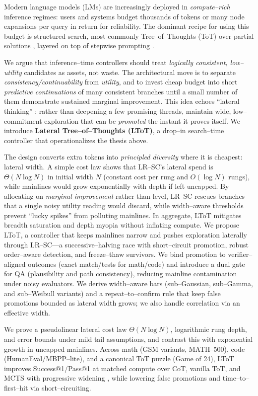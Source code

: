 \documentclass{article}
\begin{document}
Modern language models (LMs) are increasingly deployed in \emph{compute--rich} inference regimes: users and systems budget thousands of tokens or many node expansions per query in return for reliability.
The dominant recipe for using this budget is structured search, most commonly Tree--of--Thoughts (ToT) over partial solutions \citep{yao2023tot}, layered on top of stepwise prompting \citep{wei2022cot,wang2022selfconsistency,kojima2022zeroshotcot}.

We argue that inference--time controllers should treat \emph{logically consistent, low--utility} candidates as assets, not waste.
The architectural move is to separate \emph{consistency/continuability} from \emph{utility}, and to invest cheap budget into short \emph{predictive continuations} of many consistent branches until a small number of them demonstrate sustained marginal improvement.
This idea echoes ``lateral thinking'' \citep{debono1967lateral}: rather than deepening a few promising threads, maintain wide, low--commitment exploration that can be \emph{promoted} the instant it proves itself. We introduce \textbf{Lateral Tree--of--Thoughts (LToT)}, a drop--in search--time controller that operationalizes the thesis above.

The design converts extra tokens into \emph{principled diversity} where it is cheapest: lateral width.
A simple cost law shows that LR--SC's lateral spend is $\Theta(N\log N)$ in initial width $N$ (constant cost per rung and $O(\log N)$ rungs), while mainlines would grow exponentially with depth if left uncapped.
By allocating on \emph{marginal improvement} rather than level, LR--SC rescues branches that a single noisy utility reading would discard, while width--aware thresholds prevent ``lucky spikes'' from polluting mainlines.
In aggregate, LToT mitigates breadth saturation and depth myopia without inflating compute. We propose LToT, a controller that keeps mainlines narrow and pushes exploration laterally through LR--SC---a successive--halving race with short--circuit promotion, robust order--aware detection, and freeze--thaw survivors. We bind promotion to verifier--aligned outcomes (exact match/tests for math/code) and introduce a dual gate for QA (plausibility and path consistency), reducing mainline contamination under noisy evaluators. We derive width--aware bars (sub--Gaussian, sub--Gamma, and sub--Weibull variants) and a repeat--to--confirm rule that keep false promotions bounded as lateral width grows; we also handle correlation via an effective width.

\noindent We prove a pseudolinear lateral cost law $\Theta(N\log N)$, logarithmic rung depth, and error bounds under mild tail assumptions, and contrast this with exponential growth in uncapped mainlines. Across math (GSM variants, MATH--500), code (HumanEval/MBPP--lite), and a canonical ToT puzzle (Game of 24), LToT improves Success@1/Pass@1 at matched compute over CoT, vanilla ToT, and MCTS with progressive widening \citep{xie2024mcts}, while lowering false promotions and time--to--first--hit via short--circuiting.
\end{document}
